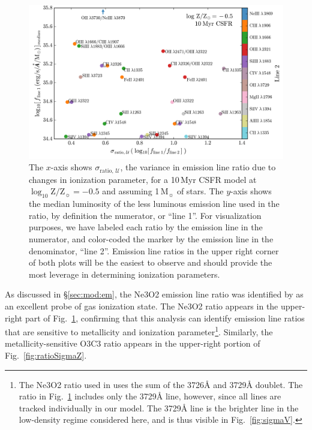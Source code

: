 \documentclass[preprint2,trackchanges]{aastex62}
\newcommand{\sigmaRU}{\ensuremath{\sigma_{\mathrm{ratio,}\,\mathcal{U}}}\xspace}
\newcommand\Msun{\ensuremath{\mathrm{M_{\sun}}}\xspace}
\newcommand{\Myr}{$\,$Myr\xspace}
\newcommand{\logten}{\ensuremath{\log_{10}}}
\newcommand{\logZeq}[1]{\ensuremath{\logten \mathrm{Z}/\mathrm{Z}_{\sun} = #1}}
\newcommand{\ang}{\ensuremath{\mbox{\AA}}\xspace}
\begin{document}
\begin{figure}
  \begin{center}
    \includegraphics[width=\linewidth]{figs/f8.png}
    \caption{The $x$-axis shows \sigmaRU, the variance in emission line ratio due to changes in ionization parameter, for a 10\Myr CSFR model at \logZeq{-0.5} and assuming 1\,\Msun of stars. The $y$-axis shows the median luminosity of the less luminous emission line used in the ratio, by definition the numerator, or ``line 1''. For visualization purposes, we have labeled each ratio by the emission line in the numerator, and color-coded the marker by the emission line in the denominator, ``line 2''.  Emission line ratios in the upper right corner of both plots will be the easiest to observe and should provide the most leverage in determining ionization parameters.}
    \label{fig:ratioSigmaU}
  \end{center}
\end{figure}


As discussed in \S\ref{sec:mod:em}, the Ne3O2 emission line ratio was identified by \citet{Levesque+2014} as an excellent probe of gas ionization state. The Ne3O2 ratio appears in the upper-right part of Fig.~\ref{fig:ratioSigmaU}, confirming that this analysis can identify emission line ratios that are sensitive to metallicity and ionization parameter\footnote{The Ne3O2 ratio used in \citet{Levesque+2014} uses the sum of the 3726\ang and 3729\ang doublet. The ratio in Fig.~\ref{fig:ratioSigmaU} includes only the 3729\ang line, however, since all lines are tracked individually in our model. The 3729\ang line is the brighter line in the low-density regime considered here, and is thus visible in Fig.~\ref{fig:sigmaV}.}. Similarly, the metallicity-sensitive O3C3 ratio \citep[e.g.,][]{Stark+2015, Du+2016, Ding+2016, Gutkin+2016, Feltre+2016} appears in the upper-right portion of Fig.~\ref{fig:ratioSigmaZ}.
\end{document}
